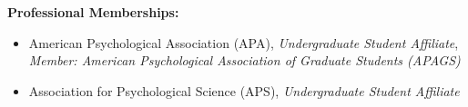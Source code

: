 \documentclass[margin]{res}
\begin{document}
\begin{resume}
		{\bf Professional Memberships:}
		\begin{itemize} \itemsep -2pt
			\item American Psychological Association (APA), {\it Undergraduate Student Affiliate}, \\ {\it Member: American Psychological Association of Graduate Students (APAGS)}
			\item Association for Psychological Science (APS), {\it Undergraduate Student Affiliate}
		\end{itemize}
		
		\end{resume}
\end{document}
